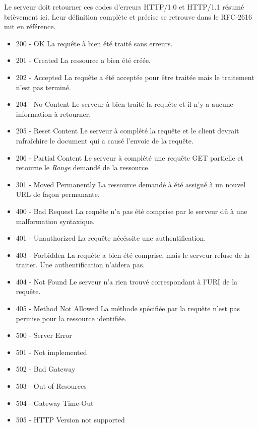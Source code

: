 \documentclass{scrreprt}
\begin{document}
Le serveur doit retourner ces codes d'erreurs HTTP/1.0 et HTTP/1.1 résumé brièvement ici. Leur définition complète et précise se retrouve dans le RFC-2616 mit en référence. \\
 \begin{itemize}
 \item 200 - OK
 \subitem La requête à bien été traité sans erreurs.
 \item 201 - Created
 \subitem La ressource a bien été créée.
 \item 202 - Accepted
 \subitem La requête a été acceptée pour être traitée mais le traitement n'est pas terminé.
 \item 204 - No Content
 \subitem Le serveur à bien traité la requête et il n'y a aucune information à retourner.
 \item 205 - Reset Content
 \subitem Le serveur à complété la requête et le client devrait rafraîchire le document qui a causé l'envoie de la requête.
 \item 206 - Partial Content
 \subitem Le serveur à complété une requête GET partielle et retourne le \textit{Range} demandé de la ressource.
 \item 301 - Moved Permanently
 \subitem La ressource demandé à été assigné à un nouvel URL de façon permanante.
 \item 400 - Bad Request
 \subitem La requête n'a pas été comprise par le serveur dû à une malformation syntaxique. 
 \item 401 - Unauthorized
 \subitem La requête nécéssite une authentification.
 \item 403 - Forbidden
 \subitem La requête a bien été comprise, mais le serveur refuse de la traiter. Une authentification n'aidera pas.
 \item 404 - Not Found
 \subitem Le serveur n'a rien trouvé correspondant à l'URI de la requête.
 \item 405 - Method Not Allowed
 \subitem La méthode spécifiée par la requête n'est pas permise pour la ressource identifiée.
 \item 500 - Server Error
 \subitem 

 \item 501 - Not implemented
 \item 502 - Bad Gateway
 \item 503 - Out of Resources
 \item 504 - Gateway Time-Out
 \item 505 - HTTP Version not supported

 \end{itemize}
\end{document}
